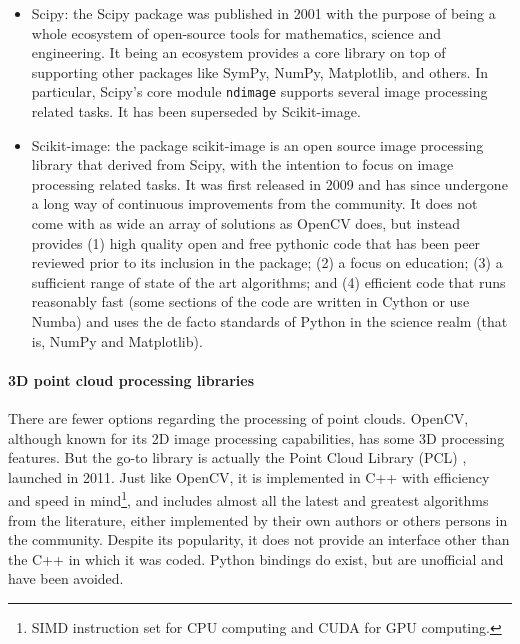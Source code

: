 \documentclass[../main.tex]{subfiles}
\begin{document}
\begin{itemize}
    \item Scipy: the Scipy package \cite{scipy_paper} was published in 2001 with the purpose of being a whole ecosystem of open-source tools for mathematics, science and engineering. It being an ecosystem provides a core library on top of supporting other packages like SymPy, NumPy, Matplotlib, and others. In particular, Scipy's core module \texttt{ndimage} supports several image processing related tasks. It has been superseded by Scikit-image.
    \item Scikit-image: the package scikit-image \cite{skimage_paper} is an open source image processing library that derived from Scipy, with the intention to focus on image processing related tasks. It was first released in 2009 and has since undergone a long way of continuous improvements from the community. It does not come with as wide an array of solutions as OpenCV does, but instead provides (1) high quality open and free pythonic code that has been peer reviewed prior to its inclusion in the package; (2) a focus on education; (3) a sufficient range of state of the art algorithms; and (4) efficient code that runs reasonably fast (some sections of the code are written in Cython or use Numba) and uses the de facto standards of Python in the science realm (that is, NumPy and Matplotlib).
\end{itemize}

\paragraph{3D point cloud processing libraries}
There are fewer options regarding the processing of point clouds. OpenCV, although known for its 2D image processing capabilities, has some 3D processing features. But the go-to library is actually the Point Cloud Library (PCL) \cite{pcl_paper}, launched in 2011. Just like OpenCV, it is implemented in C++ with efficiency and speed in mind\footnote{SIMD instruction set for CPU computing and CUDA for GPU computing.}, and includes almost all the latest and greatest algorithms from the literature, either implemented by their own authors or others persons in the community. Despite its popularity, it does not provide an interface other than the C++ in which it was coded. Python bindings do exist, but are unofficial and have been avoided.
\end{document}
